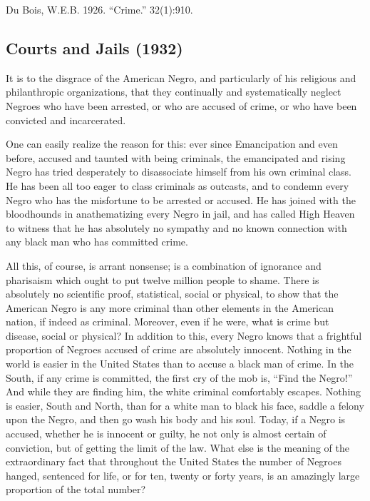 \documentclass[letterpaper,10pt,english]{jupyterBook}
\begin{document}
\sphinxAtStartPar
{} Du Bois, W.E.B. 1926. “Crime.”  32(1):9\sphinxhyphen{}10.


\subsection{Courts and Jails (1932)}
\label{\detokenize{Volumes/39/04/courts_and_jails:courts-and-jails-1932}}\label{\detokenize{Volumes/39/04/courts_and_jails::doc}}
\sphinxAtStartPar
It is to the disgrace of the American Negro, and particularly of his religious and philanthropic organizations, that they continually and systematically neglect Negroes who have been arrested, or who are accused of crime, or who have been convicted and incarcerated.

\sphinxAtStartPar
One can easily realize the reason for this: ever since Emancipation and even before, accused and taunted with being criminals, the emancipated and rising Negro has tried desperately to disassociate himself from his own criminal class. He has been all too eager to class criminals as outcasts, and to condemn every Negro who has the misfortune to be arrested or accused. He has joined with the bloodhounds in anathematizing every Negro in jail, and has called High Heaven to witness that he has absolutely no sympathy and no known connection with any black man who has committed crime.

\sphinxAtStartPar
All this, of course, is arrant nonsense; is a combination of ignorance and pharisaism which ought to put twelve million people to shame. There is absolutely no scientific proof, statistical, social or physical, to show that the American Negro is any more criminal than other elements in the American nation, if indeed as criminal. Moreover, even if he were, what is crime but disease, social or physical? In addition to this, every Negro knows that a frightful proportion of Negroes accused of crime are absolutely innocent. Nothing in the world is easier in the United States than to accuse a black man of crime. In the South, if any crime is committed, the first cry of the mob is, “Find the Negro!” And while they are finding him, the white criminal comfortably escapes. Nothing is easier, South and North, than for a white man to black his face, saddle a felony upon the Negro, and then go wash his body and his soul. Today, if a Negro is accused, whether he is innocent or guilty, he not only is almost certain of conviction, but of getting the limit of the law. What else is the meaning of the extraordinary fact that throughout the United States the number of Negroes hanged, sentenced for life, or for ten, twenty or forty years, is an amazingly large proportion of the total number?
\end{document}
